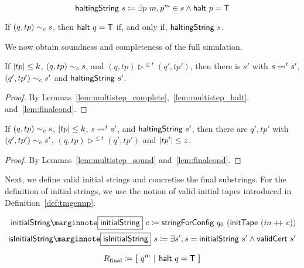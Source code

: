 \begin{definition}
  \[\textsf{haltingString}~s \coloneqq \exists p~m, p^m \in s \land \textsf{halt}~p = \mathsf{T} \]
\end{definition}

\begin{lemma}\label{lem:finalcond}
  If $(q, tp) \sim_c{} s$, then $\textsf{halt}~q = \mathsf{T}$ if, and only if, $\textsf{haltingString}~s$. 
\end{lemma}

We now obtain soundness and completeness of the full simulation.
\begin{theorem}[Completeness]
  If $|tp| \le k$, $(q, tp) \sim_c{} s$, and $(q, tp) \rhd^{\le  t} (q', tp')$, then there is $s'$ with $s \rightsquigarrow_{}^t s'$, $(q', tp') \sim_c{} s'$ and $\textsf{haltingString}~s'$. 
\end{theorem}
\begin{proof}
  By Lemmas~\ref{lem:multistep_complete},~\ref{lem:multistep_halt}, and~\ref{lem:finalcond}.
\end{proof}


\begin{theorem}[Soundness]
  If $(q, tp) \sim_c{} s$, $|tp| \le k$, $s \rightsquigarrow_{}^t s'$, and $\textsf{haltingString}~s'$, then there are $q', tp'$ with $(q', tp') \sim_c{} s'$, $(q, tp) \rhd^{\le t} (q', tp')$ and $|tp'| \le z$. 
\end{theorem}
\begin{proof}
  By Lemmas~\ref{lem:multistep_sound} and~\ref{lem:finalcond}.
\end{proof}

Next, we define valid initial strings and concretise the final substrings. 
For the definition of initial strings, we use the notion of valid initial tapes introduced in Definition~\ref{def:tmgennp}.

\newcommand{\initString}{\textsf{initialString}}
\newcommand{\isInitString}{\textsf{isInitialString}}

\begin{definition}
  \begin{align*}
    \mnotec{\initString}~c \defeq \stringForConfig~q_0~(\textsf{initTape}~(in \concat c)) \\
    \mnotec{\isInitString}~s \defeq \exists s', s = \initString~s' \land \validCert{s'}
  \end{align*}
\end{definition}

\begin{definition}
  \mnote{$\Rfinal$}
  \[R_{\text{final}} \coloneqq \textbf{[}~ q^m ~\textbf{|}~ \textsf{halt}~q = \mathsf{T} ~\textbf{]} \]
\end{definition}

